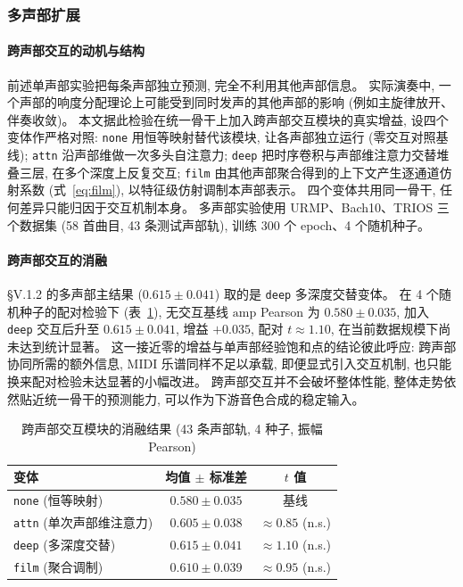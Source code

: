 \documentclass[a4paper, UTF8, zihao=-4, fontset=fandol]{ctexart}
\begin{document}
\subsubsection{多声部扩展}

\paragraph{跨声部交互的动机与结构}\quad
前述单声部实验把每条声部独立预测, 完全不利用其他声部信息。 实际演奏中, 一个声部的响度分配理论上可能受到同时发声的其他声部的影响 (例如主旋律放开、伴奏收敛)。 本文据此检验在统一骨干上加入跨声部交互模块的真实增益, 设四个变体作严格对照: \texttt{none} 用恒等映射替代该模块, 让各声部独立运行 (零交互对照基线); \texttt{attn} 沿声部维做一次多头自注意力; \texttt{deep} 把时序卷积与声部维注意力交替堆叠三层, 在多个深度上反复交互; \texttt{film} 由其他声部聚合得到的上下文产生逐通道仿射系数 (式~\ref{eq:film}), 以特征级仿射调制本声部表示。 四个变体共用同一骨干, 任何差异只能归因于交互机制本身。 多声部实验使用 URMP、Bach10、TRIOS 三个数据集 (58 首曲目, 43 条测试声部轨), 训练 300 个 epoch、4 个随机种子。

\paragraph{跨声部交互的消融}\quad
§V.1.2 的多声部主结果 ($0.615 \pm 0.041$) 取的是 \texttt{deep} 多深度交替变体。 在 4 个随机种子的配对检验下 (表~\ref{tab:interaction}), 无交互基线 $\mathrm{amp}$ Pearson 为 $0.580 \pm 0.035$, 加入 \texttt{deep} 交互后升至 $0.615 \pm 0.041$, 增益 $+0.035$, 配对 $t \approx 1.10$, 在当前数据规模下尚未达到统计显著。 这一接近零的增益与单声部经验饱和点的结论彼此呼应: 跨声部协同所需的额外信息, MIDI 乐谱同样不足以承载, 即便显式引入交互机制, 也只能换来配对检验未达显著的小幅改进。 跨声部交互并不会破坏整体性能, 整体走势依然贴近统一骨干的预测能力, 可以作为下游音色合成的稳定输入。

\begin{table}[htbp]\centering
\caption{跨声部交互模块的消融结果 (43 条声部轨, 4 种子, 振幅 Pearson)}\label{tab:interaction}
\begin{tabular}{lcc}
\toprule
变体 & 均值 $\pm$ 标准差 & $t$ 值 \\
\midrule
\texttt{none} (恒等映射) & $0.580 \pm 0.035$ & 基线 \\
\texttt{attn} (单次声部维注意力) & $0.605 \pm 0.038$ & $\approx 0.85$ (n.s.) \\
\texttt{deep} (多深度交替) & $0.615 \pm 0.041$ & $\approx 1.10$ (n.s.) \\
\texttt{film} (聚合调制) & $0.610 \pm 0.039$ & $\approx 0.95$ (n.s.) \\
\bottomrule
\end{tabular}
\end{table}
\end{document}
